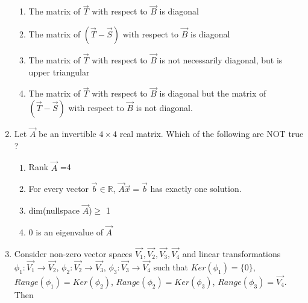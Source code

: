 \begin{enumerate}[label=\thesection.\arabic*.,ref=\thesection.\theenumi]
\begin{enumerate}
    \item The matrix of $\vec{T}$ with respect to $\vec{B}$ is diagonal
    \item The matrix of $(\vec{T}-\vec{S})$ with respect to $\vec{B}$ is diagonal
    \item The matrix of $\vec{T}$ with respect to $\vec{B}$ is not necessarily diagonal, but is upper triangular
    \item The matrix of $\vec{T}$ with respect to $\vec{B}$ is diagonal but the matrix of $(\vec{T}-\vec{S})$ with respect to $\vec{B}$ is not diagonal.
\end{enumerate}
%
\solution


\item Let $\vec{A}$ be an invertible $4 \times 4$ real matrix. Which of the following are NOT true ? 
\begin{enumerate}
\item  Rank $\vec{A}$ =4
\item For every vector $\vec{b} \in \mathbb{R}$, $\vec{A}\vec{x}=\vec{b}$ has exactly one solution. 
\item dim(nullspace $\vec{A}$)$\geq$ 1
\item 0 is an eigenvalue of $\vec{A}$
\end{enumerate}
%
\solution

\item 	Consider non-zero vector spaces $\vec{V_1}, \vec{V_2}, \vec{V_3}, \vec{V_4}$ and linear transformations $\phi_1 : \vec{V_1} \rightarrow \vec{V_2}$, $\phi_2 : \vec{V_2} \rightarrow \vec{V_3}$, $\phi_3 : \vec{V_3} \rightarrow \vec{V_4}$ such that $Ker(\phi_1) = \{0\}$, $Range(\phi_1) = Ker(\phi_2)$, $Range(\phi_2) = Ker(\phi_3)$, $Range(\phi_3) = \vec{V_4}$. Then \\
	

\end{enumerate}
